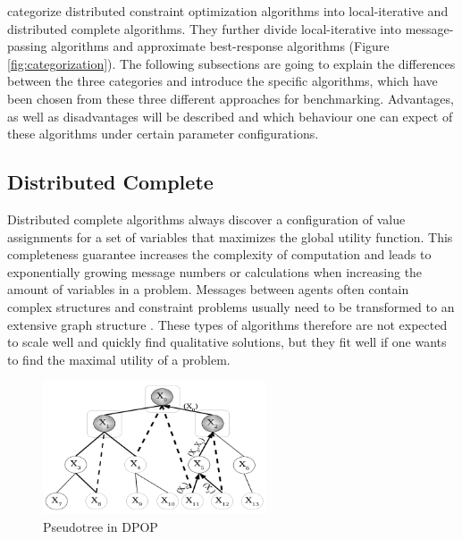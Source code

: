 \cite{Chapman2011} categorize distributed constraint optimization algorithms into local-iterative and distributed complete algorithms. They further divide local-iterative into message-passing algorithms and approximate best-response algorithms (Figure \ref{fig:categorization}). The following subsections are going to explain the differences between the three categories and introduce the specific algorithms, which have been chosen from these three different approaches for benchmarking. Advantages, as well as disadvantages will be described and which behaviour one can expect of these algorithms under certain parameter configurations.

    
\subsection{Distributed Complete}

Distributed complete algorithms always discover a configuration of value assignments for a set of variables that maximizes the global utility function. This completeness guarantee increases the complexity of computation and leads to exponentially growing message numbers or calculations when increasing the amount of variables in a problem. Messages between agents often contain complex structures and constraint problems usually need to be transformed to an extensive graph structure \cite{Chapman2011}. These types of algorithms therefore are not expected to scale well and quickly find qualitative solutions, but they fit well if one wants to find the maximal utility of a problem. 
\begin{figure}[H]
\centering
\includegraphics[width=250px]{graphics/pseudotree}
\caption{Pseudotree in DPOP \cite{Petcu2003}}
\label{fig:pseudotree}
\end{figure}

